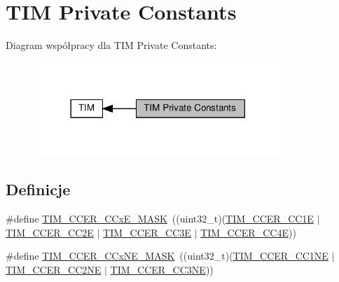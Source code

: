 \hypertarget{group___t_i_m___private___constants}{}\section{T\+IM Private Constants}
\label{group___t_i_m___private___constants}
Diagram współpracy dla T\+IM Private Constants\+:\nopagebreak
\begin{figure}[H]
\begin{center}
\leavevmode
\includegraphics[width=266pt]{group___t_i_m___private___constants}
\end{center}
\end{figure}
\subsection*{Definicje}
\begin{DoxyCompactItemize}
\item 
\#define \hyperlink{group___t_i_m___private___constants_ga5d1a1d755cda12637dfa5143130b4891}{T\+I\+M\+\_\+\+C\+C\+E\+R\+\_\+\+C\+Cx\+E\+\_\+\+M\+A\+SK}~((uint32\+\_\+t)(\hyperlink{group___peripheral___registers___bits___definition_ga3f494b9881e7b97bb2d79f7ad4e79937}{T\+I\+M\+\_\+\+C\+C\+E\+R\+\_\+\+C\+C1E} $\vert$ \hyperlink{group___peripheral___registers___bits___definition_ga76392a4d63674cd0db0a55762458f16c}{T\+I\+M\+\_\+\+C\+C\+E\+R\+\_\+\+C\+C2E} $\vert$ \hyperlink{group___peripheral___registers___bits___definition_ga1da114e666b61f09cf25f50cdaa7f81f}{T\+I\+M\+\_\+\+C\+C\+E\+R\+\_\+\+C\+C3E} $\vert$ \hyperlink{group___peripheral___registers___bits___definition_ga940b041ab5975311f42f26d314a4b621}{T\+I\+M\+\_\+\+C\+C\+E\+R\+\_\+\+C\+C4E}))
\item 
\#define \hyperlink{group___t_i_m___private___constants_gaeae61652a005098f9fe6b398d29d4279}{T\+I\+M\+\_\+\+C\+C\+E\+R\+\_\+\+C\+Cx\+N\+E\+\_\+\+M\+A\+SK}~((uint32\+\_\+t)(\hyperlink{group___peripheral___registers___bits___definition_ga813056b3f90a13c4432aeba55f28957e}{T\+I\+M\+\_\+\+C\+C\+E\+R\+\_\+\+C\+C1\+NE} $\vert$ \hyperlink{group___peripheral___registers___bits___definition_ga6a784649120eddec31998f34323d4156}{T\+I\+M\+\_\+\+C\+C\+E\+R\+\_\+\+C\+C2\+NE} $\vert$ \hyperlink{group___peripheral___registers___bits___definition_gad46cce61d3bd83b64257ba75e54ee1aa}{T\+I\+M\+\_\+\+C\+C\+E\+R\+\_\+\+C\+C3\+NE}))
\end{DoxyCompactItemize}


